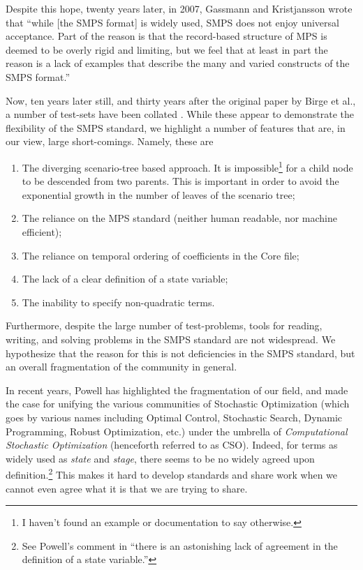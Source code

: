 \documentclass[final,1p,times]{elsarticle}
\begin{document}
Despite this hope, twenty years later, in 2007, Gassmann and Kristjansson wrote \cite{smps} that ``while [the SMPS format] is widely used, SMPS does not enjoy universal acceptance. Part of the reason is that the record-based structure of MPS is deemed to be overly rigid and limiting, but we feel that at least in part the reason is a lack of examples that describe the many and varied constructs of the SMPS format.''

Now, ten years later still, and thirty years after the original paper by Birge et al., a number of test-sets have been collated \cite{POSTS,slpset,siplib, wright,saphir}. While these appear to demonstrate the flexibility of the SMPS standard, we highlight a number of features that are, in our view, large short-comings. Namely, these are
\begin{enumerate}
    \item The diverging scenario-tree based approach. It is impossible\footnote{I haven't found an example or documentation to say otherwise.} for a child node to be descended from two parents. This is important in order to avoid the exponential growth in the number of leaves of the scenario tree;
    \item The reliance on the MPS standard (neither human readable, nor machine efficient);
    \item The reliance on temporal ordering of coefficients in the Core file;
    \item The lack of a clear definition of a state variable;
    \item The inability to specify non-quadratic terms. 
\end{enumerate}

Furthermore, despite the large number of test-problems, tools for reading, writing, and solving problems in the SMPS standard are not widespread. We hypothesize that the reason for this is not deficiencies in the SMPS standard, but an overall fragmentation of the community in general.

In recent years, Powell \cite{powell_jungle,powell_tutORial} has highlighted the fragmentation of our field, and made the case for unifying the various communities of Stochastic Optimization (which goes by various names including Optimal Control, Stochastic Search, Dynamic Programming, Robust Optimization, etc.) under the umbrella of \emph{Computational Stochastic Optimization} (henceforth referred to as CSO). Indeed, for terms as widely used as \emph{state} and \emph{stage}, there seems to be no widely agreed upon definition.\footnote{See Powell's comment in \cite{powell_jungle} ``there is an astonishing lack of agreement in the definition of a state variable.''} This makes it hard to develop standards and share work when we cannot even agree what it is that we are trying to share.
\end{document}
